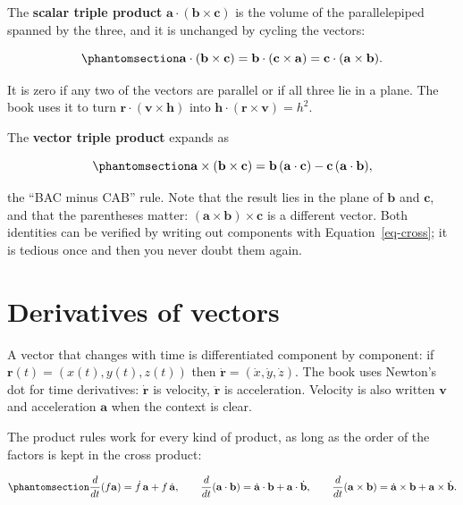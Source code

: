 \documentclass[
  10.5pt,
  letterpaper,
]{scrbook}
\theoremstyle{definition}
\theoremstyle{plain}
\theoremstyle{remark}
\begin{document}
The \textbf{scalar triple product}
\(\mathbf{a}\cdot(\mathbf{b}\times\mathbf{c})\) is the volume of the
parallelepiped spanned by the three, and it is unchanged by cycling the
vectors:

\begin{equation}\protect\phantomsection\label{eq-scalar-triple}{
\mathbf{a}\cdot(\mathbf{b}\times\mathbf{c}) = \mathbf{b}\cdot(\mathbf{c}\times\mathbf{a}) = \mathbf{c}\cdot(\mathbf{a}\times\mathbf{b}).
}\end{equation}

It is zero if any two of the vectors are parallel or if all three lie in
a plane. The book uses it to turn
\(\mathbf{r}\cdot(\mathbf{v}\times\mathbf{h})\) into
\(\mathbf{h}\cdot(\mathbf{r}\times\mathbf{v}) = h^2\).

The \textbf{vector triple product} expands as

\begin{equation}\protect\phantomsection\label{eq-vector-triple}{
\mathbf{a}\times(\mathbf{b}\times\mathbf{c}) = \mathbf{b}\,(\mathbf{a}\cdot\mathbf{c}) - \mathbf{c}\,(\mathbf{a}\cdot\mathbf{b}),
}\end{equation}

the ``BAC minus CAB'' rule. Note that the result lies in the plane of
\(\mathbf{b}\) and \(\mathbf{c}\), and that the parentheses matter:
\((\mathbf{a}\times\mathbf{b})\times\mathbf{c}\) is a different vector.
Both identities can be verified by writing out components with
Equation~\ref{eq-cross}; it is tedious once and then you never doubt
them again.

\section{Derivatives of vectors}\label{derivatives-of-vectors}

A vector that changes with time is differentiated component by
component: if \(\mathbf{r}(t) = (x(t), y(t), z(t))\) then
\(\dot{\mathbf{r}} = (\dot x, \dot y, \dot z)\). The book uses Newton's
dot for time derivatives: \(\dot{\mathbf{r}}\) is velocity,
\(\ddot{\mathbf{r}}\) is acceleration. Velocity is also written
\(\mathbf{v}\) and acceleration \(\mathbf{a}\) when the context is
clear.

The product rules work for every kind of product, as long as the order
of the factors is kept in the cross product:

\begin{equation}\protect\phantomsection\label{eq-vector-product-rules}{
\frac{d}{dt}(f\mathbf{a}) = \dot f\,\mathbf{a} + f\,\dot{\mathbf{a}}, \qquad
\frac{d}{dt}(\mathbf{a}\cdot\mathbf{b}) = \dot{\mathbf{a}}\cdot\mathbf{b} + \mathbf{a}\cdot\dot{\mathbf{b}}, \qquad
\frac{d}{dt}(\mathbf{a}\times\mathbf{b}) = \dot{\mathbf{a}}\times\mathbf{b} + \mathbf{a}\times\dot{\mathbf{b}}.
}\end{equation}
\end{document}
